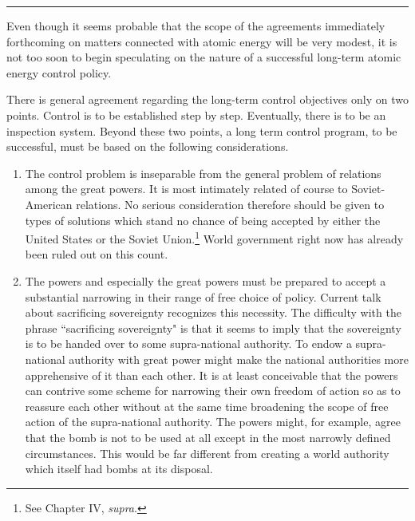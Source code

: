 \noindent\hfil\rule{0.4\textwidth}{.4pt}\hfil

\vspace{4pt}

Even though it seems probable that the scope of the agreements immediately forthcoming on matters connected with atomic energy will be very modest, it is not too soon to begin speculating on the nature of a successful long-term atomic energy control policy.

There is general agreement regarding the long-term control objectives only on two points. Control is to be established step by step. Eventually, there is to be an inspection system. Beyond these two points, a long term control program, to be successful, must be based on the following considerations.

\begin{enumerate}[1.]

\item The control problem is inseparable from the general problem of relations among the great powers. It is most intimately related of course to Soviet-American relations. No serious consideration therefore should be given to types of solutions which stand no chance of being accepted by either the United States or the Soviet Union.\footnote{See Chapter IV, \textit{supra}.} World government right now has already been ruled out on this count.

\item The powers and especially the great powers must be prepared to accept a substantial narrowing in their range of free choice of policy. Current talk about sacrificing sovereignty recognizes this necessity. The difficulty with the phrase ``sacrificing sovereignty" is that it seems to imply that the sovereignty is to be handed over to some supra-national authority. To endow a supra-national authority with great power might make the national authorities more apprehensive of it than each other. It is at least conceivable that the powers can contrive some scheme for narrowing their own freedom of action so as to reassure each other without at the same time broadening the scope of free action of the supra-national authority. The powers might, for example, agree that the bomb is not to be used at all except in the most narrowly defined circumstances. This would be far different from creating a world authority which itself had bombs at its disposal.


\end{enumerate}
